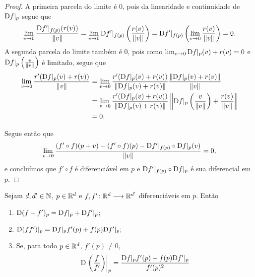 \begin{proof}
A primeira parcela do limite é $0$, pois da linearidade e continuidade de $\mathrm{D} f|_p$ segue que
	\begin{equation*}
	\lim_{v \rightarrow 0} \frac{\mathrm{D} f'|_{f(p)} (r(v))}{\left\Vert{v}\right\Vert} = \lim_{v \rightarrow 0} \mathrm{D} f'|_{f(p)} \left( \frac{r(v)}{\left\Vert{v}\right\Vert} \right) = \mathrm{D} f'|_{f(p)} \left( \lim_{v \rightarrow 0} \frac{r(v)}{\left\Vert{v}\right\Vert} \right) = 0.
	\end{equation*}
A segunda parcela do limite também é $0$, pois como $\lim_{v \rightarrow 0} \mathrm{D} f|_p(v) + r(v) = 0$ e $\mathrm{D} f|_p \left( \frac{v}{\left\Vert{v}\right\Vert} \right)$ é limitado, segue que
	\begin{align*}
	\lim_{v \rightarrow 0} \frac{r'(\mathrm{D} f|_p(v) + r(v))}{\left\Vert{v}\right\Vert} &= \lim_{v \rightarrow 0} \frac{r'(\mathrm{D} f|_p(v) + r(v))}{\left\Vert{\mathrm{D}f|_p(v) + r(v)}\right\Vert} \frac{\left\Vert{\mathrm{D}f|_p(v) + r(v)}\right\Vert}{\left\Vert{v}\right\Vert}\\
		&= \lim_{v \rightarrow 0} \frac{r'(\mathrm{D} f|_p(v) + r(v))}{\left\Vert{\mathrm{D}f|_p(v) + r(v)}\right\Vert} \left\Vert{\mathrm{D}f|_p \left( \frac{v}{\left\Vert{v}\right\Vert} \right) + \frac{r(v)}{\left\Vert{v}\right\Vert}}\right\Vert \\
		&= 0.
	\end{align*}

Segue então que
	\begin{equation*}
	\lim_{v \rightarrow 0} \frac{(f' \circ f)(p+v) - (f' \circ f)(p) - \mathrm{D} f'|_{f(p)} \circ \mathrm{D} f|_p(v)}{\left\Vert{v}\right\Vert} = 0,
	\end{equation*}
e concluímos que $f' \circ f$ é diferenciável em $p$ e $\mathrm{D} f'|_{f(p)} \circ \mathrm{D} f|_p$ é sua diferencial em $p$.
\end{proof}

\begin{exercise}
Sejam $d,d' \in \mathbb{N}$, $p \in \mathbb{R}^d$ e ${f,f'}\colon {\mathbb{R}^d} \longrightarrow {\mathbb{R}^{d'}}$ diferenciáveis em $p$. Então
	\begin{enumerate}
	\item $\mathrm{D} (f+f')_p = \mathrm{D} f|_p + \mathrm{D} f'|_p$;
	\item $\mathrm{D} (ff')|_p = \mathrm{D} f|_p f'(p) + f(p)\mathrm{D} f'|_p;$
	\item Se, para todo $p \in \mathbb{R}^d$, $f'(p) \neq 0$,
	\begin{equation*}
	\mathrm{D} \left. \left(\frac{f}{f'}\right) \right|_p = \frac{\mathrm{D} f|_p f'(p) - f(p)\mathrm{D} f'|_p}{f'(p)^2}
	\end{equation*}
	\end{enumerate}
\end{exercise}

